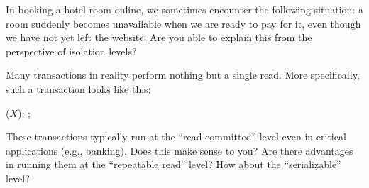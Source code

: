  In booking a hotel room online, we sometimes encounter the following situation: a room suddenly becomes unavailable when we are ready to pay for it, even though we have not yet left the website. Are you able to explain this from the perspective of isolation levels?

 Many transactions in reality perform nothing but a single read. More specifically, such a transaction looks like this:
\begin{center}
    ($X$); ;
\end{center}
These transactions typically run at the ``read committed'' level even in critical applications (e.g., banking). Does this make sense to you? Are there advantages in running them at the ``repeatable read'' level? How about the ``serializable'' level?


